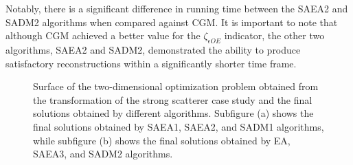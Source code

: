 			Notably, there is a significant difference in running time between the SAEA2 and SADM2 algorithms when compared against CGM. It is important to note that although CGM achieved a better value for the $\zeta_{\epsilon OE}$ indicator, the other two algorithms, SAEA2 and SADM2, demonstrated the ability to produce satisfactory reconstructions within a significantly shorter time frame.
		
			\begin{figure}
				\centering
				 \hspace{.05\textwidth}
				\caption[Surface of the two-dimensional optimization problem obtained from the transformation of the strong scatterer case study and the final solutions obtained by different algorithms.]{Surface of the two-dimensional optimization problem obtained from the transformation of the strong scatterer case study and the final solutions obtained by different algorithms. Subfigure (a) shows the final solutions obtained by SAEA1, SAEA2, and SADM1 algorithms, while subfigure (b) shows the final solutions obtained by EA, SAEA3, and SADM2 algorithms.}
				\label{fig:results:casestudy:strong:surface}
			\end{figure}
		
